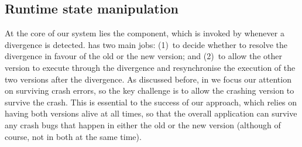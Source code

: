 
\subsection{Runtime state manipulation}
\label{sec:rem}

At the core of our system lies the \rem component, which is invoked
by \mxm whenever a divergence is detected.  \rem has two main jobs:
(1)~to decide whether to resolve the divergence in favour of the old or
the new version; and (2)~to allow the other version to execute through
the divergence and resynchronise the execution of the two versions
after the divergence.
As discussed before, in \mx we focus our attention on surviving
crash errors, so the key challenge is to allow the crashing version to
survive the crash.  This is essential to the success of our approach,
which relies on having both versions alive at all times, so that
the overall application can survive any crash bugs that happen in
either the old or the new version (although of course, not in both at
the same time).

